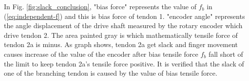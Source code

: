 \documentclass{llncs}
\begin{document}
In Fig. \ref{fig:slack_conclusion}, "bias force" represents the value of $f_b$ in (\ref{eq:independent-f}) and this is bias force of tendon 1.
"encoder angle" represents the angle displacement of the drive shaft measured by the rotary encoder which drive tendon 2.
The area painted gray is which mathematically tensile force of tendon 2a is minus.
As graph shows, tendon 2a get slack and finger movement causes increase of the value of the encoder after bias tensile force $f_b$ fall short of the limit to keep tendon 2a's tensile force positive.
It is verified that the slack of one of the branching tendon is caused by the value of bias tensile force.

	

\end{document}
